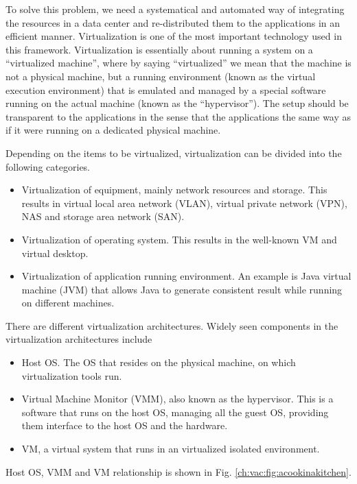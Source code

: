 To solve this problem, we need a systematical and automated way of integrating the resources in a data center and re-distributed them to the applications in an efficient manner. Virtualization is one of the most important technology used in this framework. Virtualization is essentially about running a system on a ``virtualized machine'', where by saying ``virtualized'' we mean that the machine is not a physical machine, but a running environment (known as the virtual execution environment) that is emulated and managed by a special software running on the actual machine (known as the ``hypervisor''). The setup should be transparent to the applications in the sense that the applications the same way as if it were running on a dedicated physical machine.

Depending on the items to be virtualized, virtualization can be divided into the following categories.
\begin{itemize}
  \item Virtualization of equipment, mainly network resources and storage. This results in virtual local area network (VLAN), virtual private network (VPN), NAS and storage area network (SAN).
  \item Virtualization of operating system. This results in the well-known VM and virtual desktop.
  \item Virtualization of application running environment. An example is Java virtual machine (JVM) that allows Java to generate consistent result while running on different machines.
\end{itemize}

There are different virtualization architectures. Widely seen components in the virtualization architectures include
\begin{itemize}
	\item Host OS. The OS that resides on the physical machine, on which virtualization tools run.
	\item Virtual Machine Monitor (VMM), also known as the hypervisor. This is a software that runs on the host OS, managing all the guest OS, providing them interface to the host OS and the hardware.
	\item VM, a virtual system that runs in an virtualized isolated environment.
\end{itemize}
Host OS, VMM and VM relationship is shown in Fig. \ref{ch:vac:fig:acookinakitchen}.

